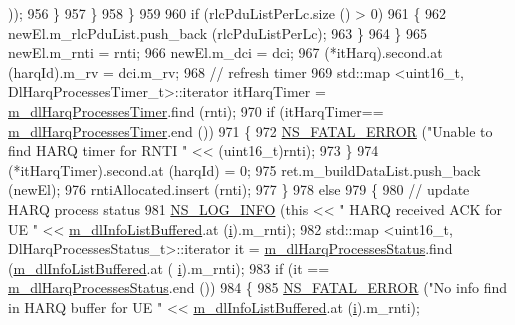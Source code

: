 \begin{DoxyCode}
      ));
956                         \}
957                     \}
958                 \}
959 
960               \textcolor{keywordflow}{if} (rlcPduListPerLc.size () > 0)
961                 \{
962                   newEl.m\_rlcPduList.push\_back (rlcPduListPerLc);
963                 \}
964             \}
965           newEl.m\_rnti = rnti;
966           newEl.m\_dci = dci;
967           (*itHarq).second.at (harqId).m\_rv = dci.m\_rv;
968           \textcolor{comment}{// refresh timer}
969           std::map <uint16\_t, DlHarqProcessesTimer\_t>::iterator itHarqTimer = 
      \hyperlink{classns3_1_1FdMtFfMacScheduler_ae68e481ecd9623d2eb74461160c8543b}{m\_dlHarqProcessesTimer}.find (rnti);
970           \textcolor{keywordflow}{if} (itHarqTimer== \hyperlink{classns3_1_1FdMtFfMacScheduler_ae68e481ecd9623d2eb74461160c8543b}{m\_dlHarqProcessesTimer}.end ())
971             \{
972               \hyperlink{group__fatal_ga5131d5e3f75d7d4cbfd706ac456fdc85}{NS\_FATAL\_ERROR} (\textcolor{stringliteral}{"Unable to find HARQ timer for RNTI "} << (uint16\_t)rnti);
973             \}
974           (*itHarqTimer).second.at (harqId) = 0;
975           ret.m\_buildDataList.push\_back (newEl);
976           rntiAllocated.insert (rnti);
977         \}
978       \textcolor{keywordflow}{else}
979         \{
980           \textcolor{comment}{// update HARQ process status}
981           \hyperlink{group__logging_gafbd73ee2cf9f26b319f49086d8e860fb}{NS\_LOG\_INFO} (\textcolor{keyword}{this} << \textcolor{stringliteral}{" HARQ received ACK for UE "} << 
      \hyperlink{classns3_1_1FdMtFfMacScheduler_ac7f5da1ae0cf374d49f379b07c2c78a7}{m\_dlInfoListBuffered}.at (\hyperlink{bernuolliDistribution_8m_a6f6ccfcf58b31cb6412107d9d5281426}{i}).m\_rnti);
982           std::map <uint16\_t, DlHarqProcessesStatus\_t>::iterator it = 
      \hyperlink{classns3_1_1FdMtFfMacScheduler_a9da9ca73b704b7386f3b751274e1f3e5}{m\_dlHarqProcessesStatus}.find (\hyperlink{classns3_1_1FdMtFfMacScheduler_ac7f5da1ae0cf374d49f379b07c2c78a7}{m\_dlInfoListBuffered}.at (
      \hyperlink{bernuolliDistribution_8m_a6f6ccfcf58b31cb6412107d9d5281426}{i}).m\_rnti);
983           \textcolor{keywordflow}{if} (it == \hyperlink{classns3_1_1FdMtFfMacScheduler_a9da9ca73b704b7386f3b751274e1f3e5}{m\_dlHarqProcessesStatus}.end ())
984             \{
985               \hyperlink{group__fatal_ga5131d5e3f75d7d4cbfd706ac456fdc85}{NS\_FATAL\_ERROR} (\textcolor{stringliteral}{"No info find in HARQ buffer for UE "} << 
      \hyperlink{classns3_1_1FdMtFfMacScheduler_ac7f5da1ae0cf374d49f379b07c2c78a7}{m\_dlInfoListBuffered}.at (\hyperlink{bernuolliDistribution_8m_a6f6ccfcf58b31cb6412107d9d5281426}{i}).m\_rnti);

\end{DoxyCode}
